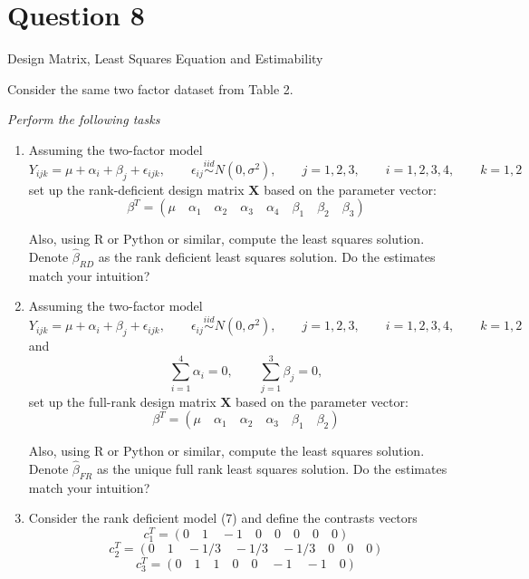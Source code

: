\documentclass[letterpaper]{article}
\begin{document}
		\clearpage
		
		\section{Question 8}
		{\color{deepred}  Design Matrix, Least Squares Equation and Estimability}
		
		Consider the same two factor dataset from Table 2.
		
		\emph{Perform the following tasks}
		\begin{enumerate}
			\item[(i)] Assuming the two-factor model
			\begin{equation}
				Y_{ijk}=\mu+\alpha_i+\beta_j+\epsilon_{ijk},
				\qquad
				\epsilon_{ij}\overset{iid}{\sim}N(0,\sigma^2),
				\qquad
				j=1,2,3,
				\qquad
				i=1,2,3,4,
				\qquad
				k=1,2
			\end{equation}
			set up the rank-deficient design matrix $\mathbf{X}$ based on the parameter vector:
			\[
			\beta^T=(\mu \quad \alpha_1 \quad \alpha_2 \quad \alpha_3 \quad \alpha_4 \quad \beta_1 \quad \beta_2 \quad \beta_3)
			\]
			
			Also, using R or Python or similar, compute the least squares solution. Denote $\hat{\beta}_{RD}$ as the rank deficient least squares solution. Do the estimates match your intuition?
			
			\item[(ii)] Assuming the two-factor model
			\begin{equation}
				Y_{ijk}=\mu+\alpha_i+\beta_j+\epsilon_{ijk},
				\qquad
				\epsilon_{ij}\overset{iid}{\sim}N(0,\sigma^2),
				\qquad
				j=1,2,3,
				\qquad
				i=1,2,3,4,
				\qquad
				k=1,2
			\end{equation}
			and
			\begin{equation}
				\sum_{i=1}^4 \alpha_i=0,
				\qquad
				\sum_{j=1}^3 \beta_j=0,
			\end{equation}
			set up the full-rank design matrix $\mathbf{X}$ based on the parameter vector:
			\[
			\beta^T=(\mu \quad \alpha_1 \quad \alpha_2 \quad \alpha_3 \quad \beta_1 \quad \beta_2)
			\]
			
			Also, using R or Python or similar, compute the least squares solution. Denote $\hat{\beta}_{FR}$ as the unique full rank least squares solution. Do the estimates match your intuition?
			
			\item[(iii)] Consider the rank deficient model (7) and define the contrasts vectors
			\[
			c_1^T=(0 \quad 1 \quad -1 \quad 0 \quad 0 \quad 0 \quad 0 \quad 0)
			\]
			\[
			c_2^T=(0 \quad 1 \quad -1/3 \quad -1/3 \quad -1/3 \quad 0 \quad 0 \quad 0)
			\]
			\[
			c_3^T=(0 \quad 1 \quad 1 \quad 0 \quad 0 \quad -1 \quad -1 \quad 0)
			\]
			

\end{enumerate}
\end{document}
